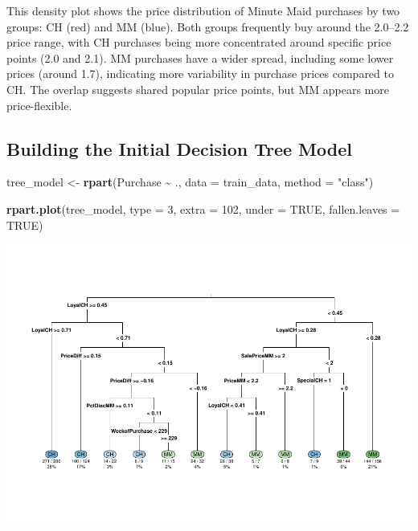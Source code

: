 \documentclass[
]{article}
\newenvironment{Shaded}{\begin{snugshade}}{\end{snugshade}}
\newcommand{\AttributeTok}[1]{\textcolor[rgb]{0.13,0.29,0.53}{#1}}
\newcommand{\ConstantTok}[1]{\textcolor[rgb]{0.56,0.35,0.01}{#1}}
\newcommand{\DecValTok}[1]{\textcolor[rgb]{0.00,0.00,0.81}{#1}}
\newcommand{\FunctionTok}[1]{\textcolor[rgb]{0.13,0.29,0.53}{\textbf{#1}}}
\newcommand{\NormalTok}[1]{#1}
\newcommand{\OtherTok}[1]{\textcolor[rgb]{0.56,0.35,0.01}{#1}}
\newcommand{\SpecialCharTok}[1]{\textcolor[rgb]{0.81,0.36,0.00}{\textbf{#1}}}
\newcommand{\StringTok}[1]{\textcolor[rgb]{0.31,0.60,0.02}{#1}}
\begin{document}
This density plot shows the price distribution of Minute Maid purchases
by two groups: CH (red) and MM (blue). Both groups frequently buy around
the 2.0--2.2 price range, with CH purchases being more concentrated
around specific price points (2.0 and 2.1). MM purchases have a wider
spread, including some lower prices (around 1.7), indicating more
variability in purchase prices compared to CH. The overlap suggests
shared popular price points, but MM appears more price-flexible.

\hypertarget{building-the-initial-decision-tree-model}{%
\subsection{Building the Initial Decision Tree
Model}\label{building-the-initial-decision-tree-model}}

\begin{Shaded}
\begin{Highlighting}[]
\NormalTok{tree\_model }\OtherTok{\textless{}{-}} \FunctionTok{rpart}\NormalTok{(Purchase }\SpecialCharTok{\textasciitilde{}}\NormalTok{ ., }\AttributeTok{data =}\NormalTok{ train\_data, }\AttributeTok{method =} \StringTok{"class"}\NormalTok{)}

\FunctionTok{rpart.plot}\NormalTok{(tree\_model, }\AttributeTok{type =} \DecValTok{3}\NormalTok{, }\AttributeTok{extra =} \DecValTok{102}\NormalTok{, }\AttributeTok{under =} \ConstantTok{TRUE}\NormalTok{, }\AttributeTok{fallen.leaves =} \ConstantTok{TRUE}\NormalTok{)}
\end{Highlighting}
\end{Shaded}

\includegraphics{OJ_files/figure-latex/unnamed-chunk-7-1.pdf}
\end{document}
